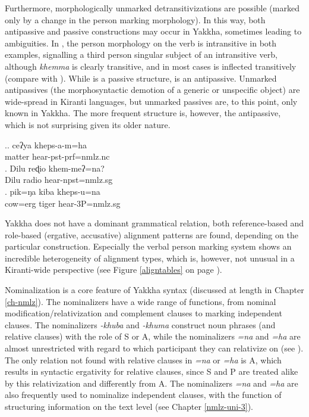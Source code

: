 Furthermore, morphologically unmarked detransitivizations are possible (marked only by a change in the person marking morphology). In this way, both antipassive and passive constructions may occur in Yakkha, sometimes leading to ambiguities. In \Next, the person morphology on the verb is intransitive in both examples, signalling a third person singular subject of an intransitive verb, although \emph{khemma}  is clearly transitive, and in most cases is inflected transitively (compare with \Next[c]). While \Next[a] is a passive structure, \Next[b] is an antipassive. Unmarked antipassives (the morphosyntactic demotion of a generic or unspecific object) are wide-spread in Kiranti languages, but unmarked passives are, to this point, only known in Yakkha. The more frequent structure is, however, the antipassive, which is not surprising given its older nature.

\ex.\ag. ceʔya kheps-a-m=ha\\
matter hear{\sc [3sg]-pst-prf=nmlz.nc}\\
\bg. Dilu  reɖio khem-meʔ=na?\\
Dilu radio  hear{\sc [3sg]-npst=nmlz.sg}\\
\bg. pik=ŋa kiba kheps-u=na\\
cow{\sc =erg} tiger hear{\sc [pst]-3P=nmlz.sg}\\



Yakkha does not have a dominant grammatical relation, both reference-based and role-based (ergative, accusative) alignment patterns are found, depending on the particular construction. Especially the verbal person marking system shows an incredible heterogeneity of alignment types, which is, however, not unusual in a Kiranti-wide perspective (see Figure \ref{aligntables} on page \pageref{aligntables}). 

Nominalization is a core feature of Yakkha syntax (discussed at length in Chapter \ref{ch-nmlz}). The nominalizers have a wide range of functions, from nominal modification/relativization and complement clauses to marking independent clauses. The nominalizers \emph{-khuba} and \emph{-khuma} construct noun phrases (and relative clauses) with the role of S or A, while the nominalizers \emph{=na} and \emph{=ha} are almost unrestricted with regard to which participant they can relativize on (see \Next). The only relation not found with relative clauses in \emph{=na} or \emph{=ha} is A, which results in syntactic ergativity for relative clauses, since S and P are treated alike by this relativization and differently from A.
The nominalizers \emph{=na} and \emph{=ha} are also frequently used to nominalize independent clauses, with the function of structuring information  on the text level (see Chapter \ref{nmlz-uni-3}). 

